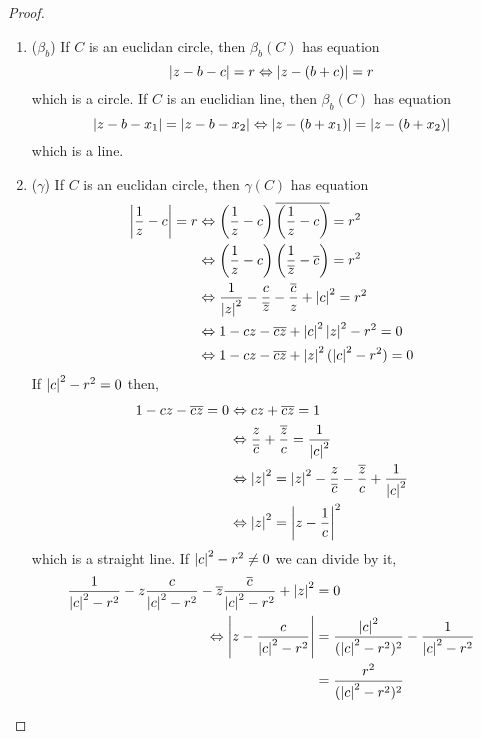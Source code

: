 \documentclass{article}
\begin{document}
\begin{proof}
\begin{enumerate}[cases]
        \item ($\beta_b$)  If $C$ is an euclidan circle, then $\beta_b(C)$ has equation
        \[
            \left\lvert z - b - c\right\rvert = r \Leftrightarrow \left\lvert z - (b + c)\right\rvert = r
        \]
        which is a circle. If $C$ is an euclidian line, then $\beta_b(C)$ has equation
        \[
            \left\lvert z - b - x_1\right\rvert = \left\lvert z - b - x_2\right\rvert \Leftrightarrow \left\lvert z - (b + x_1)\right\rvert = \left\lvert z - (b + x_2)\right\rvert
        \]
        which is a line.

        \item ($\gamma$) If $C$ is an euclidan circle, then $\gamma(C)$ has equation
        \begin{align*}
            \left\lvert \frac{1}{z} - c\right\rvert = r &\Leftrightarrow \left( \frac{1}{z} - c \right)\overline{\left( \frac{1}{z} - c \right)} = r^2 \\
            &\Leftrightarrow \left( \frac{1}{z} - c \right)\left( \frac{1}{\overline{z}} - \overline{c} \right) = r^2 \\
            &\Leftrightarrow \frac{1}{\left\lvert z\right\rvert^2} - \frac{c}{\overline{z}} - \frac{\overline{c}}{z} + \left\lvert c\right\rvert^2 = r^2 \\
            &\Leftrightarrow 1 - cz - \overline{cz} + \left\lvert c\right\rvert^2\left\lvert z\right\rvert^2 - r^2 = 0 \\
            &\Leftrightarrow 1 - cz - \overline{cz} + \left\lvert z\right\rvert^2(\left\lvert c\right\rvert^2 - r^2) = 0
        \end{align*}
        If $\left\lvert c\right\rvert^2 - r^2 = 0$ then,
        \begin{align*}
            1- cz - \overline{cz} = 0 &\Leftrightarrow cz + \overline{cz} = 1 \\
            &\Leftrightarrow \frac{z}{\overline{c}} + \frac{\overline{z}}{c} = \frac{1}{\left\lvert c\right\rvert^2} \\
            &\Leftrightarrow \left\lvert z\right\rvert^2 = \left\lvert z\right\rvert^2 - \frac{z}{\overline{c}} - \frac{\overline{z}}{c} + \frac{1}{\left\lvert c\right\rvert^2} \\
            &\Leftrightarrow \left\lvert z\right\rvert^2 = \left\lvert z - \frac{1}{c}\right\rvert^2
        \end{align*}
        which is a straight line.
        If $\left\lvert c\right\rvert^2 - r^2 \neq 0$ we can divide by it,
        \begin{align*}
            \frac{1}{\abs{c}^2 - r^2} - z\frac{c}{\abs{c}^2 - r^2} - \overline{z}\frac{\overline{c}}{\abs{c}^2 - r^2} + \abs{z}^2 &= 0 \\
            \Leftrightarrow \abs{z - \frac{c}{\abs{c}^2 - r^2}} &= \frac{\abs{c}^2}{(\abs{c}^2 - r^2)^2} - \frac{1}{\abs{c}^2 - r^2} \\
            &= \frac{r^2}{(\abs{c}^2 - r^2)^2}

\end{align*}
\end{enumerate}
\end{proof}
\end{document}
